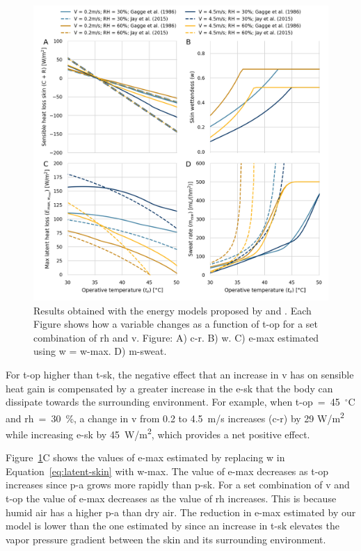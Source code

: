 \begin{figure}[thb!]
    \centering
    \includegraphics[width=\textwidth]{figures/comparison_models_v2}
    \caption{Results obtained with the energy models proposed by  and .
    Each Figure shows how a variable changes as a function of \ac{t-op} for a set combination of \ac{rh} and \ac{v}.
    Figure: A) \Acf{c-r}.
    B) \Acf{w}.
    C) \Acf{e-max} estimated using \ac{w} = \ac{w-max}.
    D) \Acf{m-sweat}.}
    \label{fig:comparison_models}
\end{figure}

For \ac{t-op} higher than \ac{t-sk}, the negative effect that an increase in \ac{v} has on sensible heat gain is compensated by a greater increase in the \acf{e-sk} that the body can dissipate towards the surrounding environment.
For example, when \ac{t-op}~=~45~$^{\circ}$C and \ac{rh}~=~30~\%, a change in \ac{v} from 0.2 to 4.5~m/s increases (\acs{c-r}) by 29 W/m\textsuperscript{2} while increasing \ac{e-sk} by 45~W/m\textsuperscript{2}, which provides a net positive effect.

Figure~\ref{fig:comparison_models}C shows the values of \ac{e-max} estimated by replacing \ac{w} in Equation~\ref{eq:latent-skin} with \ac{w-max}.
The value of \ac{e-max} decreases as \ac{t-op} increases since \ac{p-a} grows more rapidly than \ac{p-sk}.
For a set combination of \ac{v} and \ac{t-op} the value of \ac{e-max} decreases as the value of \ac{rh} increases.
This is because humid air has a higher \ac{p-a} than dry air.
The reduction in \ac{e-max} estimated by our model is lower than the one estimated by  since an increase in \ac{t-sk} elevates the vapor pressure gradient between the skin and its surrounding environment.

